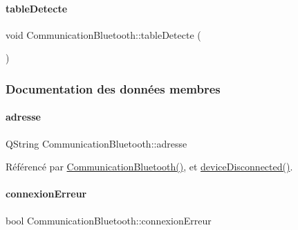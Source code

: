 \paragraph{\texorpdfstring{table\+Detecte}{tableDetecte}}
{\footnotesize\ttfamily void Communication\+Bluetooth\+::table\+Detecte (\begin{DoxyParamCaption}{ }\end{DoxyParamCaption})\hspace{0.3cm}{\ttfamily [signal]}}



\subsubsection{Documentation des données membres}
\mbox{\label{class_communication_bluetooth_a20fd97fb70e36e0dfb8dadcc25484302}} 
\paragraph{\texorpdfstring{adresse}{adresse}}
{\footnotesize\ttfamily Q\+String Communication\+Bluetooth\+::adresse\hspace{0.3cm}{\ttfamily [private]}}



Référencé par \hyperlink{class_communication_bluetooth_aa759c75b0df7f7e237eec495f156bba0}{Communication\+Bluetooth()}, et \hyperlink{class_communication_bluetooth_aaaeaea386c629e980580072f7221b9f0}{device\+Disconnected()}.

\mbox{\label{class_communication_bluetooth_a7b313bd3b054faaf59244a297880bf7a}} 
\paragraph{\texorpdfstring{connexion\+Erreur}{connexionErreur}}
{\footnotesize\ttfamily bool Communication\+Bluetooth\+::connexion\+Erreur\hspace{0.3cm}{\ttfamily [private]}}



